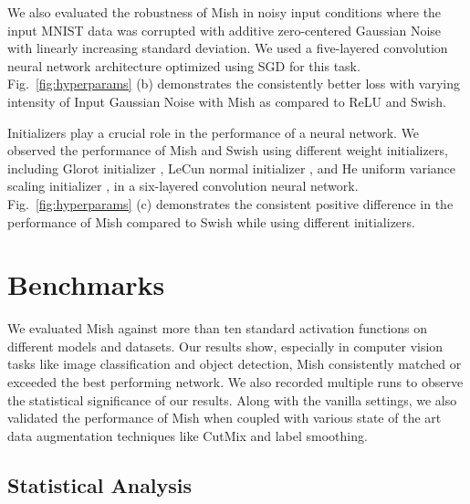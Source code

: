 \documentclass{bmvc2k}
\begin{document}
We also evaluated the robustness of Mish in noisy input conditions where the input MNIST data was corrupted with additive zero-centered Gaussian Noise with linearly increasing standard deviation. We used a five-layered convolution neural network architecture optimized using SGD for this task. Fig.~\ref{fig:hyperparams} (b) demonstrates the consistently better loss with varying intensity of Input Gaussian Noise with Mish as compared to ReLU and Swish.

Initializers \cite{glorot2010understanding} play a crucial role in the performance of a neural network. We observed the performance of Mish and Swish using different weight initializers, including Glorot initializer \cite{glorot2010understanding}, LeCun normal initializer \cite{lecun2012efficient}, and He uniform variance scaling initializer \cite{he2015delving}, in a six-layered convolution neural network. Fig.~\ref{fig:hyperparams} (c) demonstrates the consistent positive difference in the performance of Mish compared to Swish while using different initializers.

\section{Benchmarks}
\label{sec:benchamrks}

We evaluated Mish against more than ten standard activation functions on different models and datasets. Our results show, especially in computer vision tasks like image classification and object detection, Mish consistently matched or exceeded the best performing network. We also recorded multiple runs to observe the statistical significance of our results. Along with the vanilla settings, we also validated the performance of Mish when coupled with various state of the art data augmentation techniques like CutMix and label smoothing. 

\subsection{Statistical Analysis}
\end{document}
